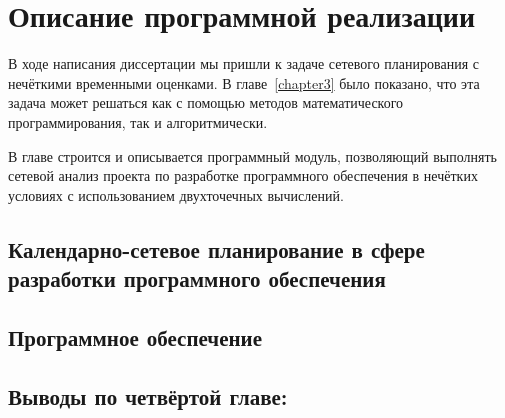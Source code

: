 \chapter{Описание программной реализации}
\label{chapter4}

В ходе написания диссертации мы пришли к задаче сетевого планирования с нечёткими временными оценками.  В главе~\ref{chapter3} было показано, что эта задача может решаться как с помощью методов математического программирования, так и алгоритмически.

В главе строится и описывается программный модуль, позволяющий выполнять сетевой анализ проекта по разработке программного обеспечения в нечётких условиях с использованием двухточечных вычислений.

\section{Календарно-сетевое планирование в сфере разработки программного обеспечения} 
\label{chapter4_1}


\section{Программное обеспечение} 
\label{chapter4_2}


\newpage
\section*{Выводы по четвёртой главе:} 
\label{chapter4_3}
